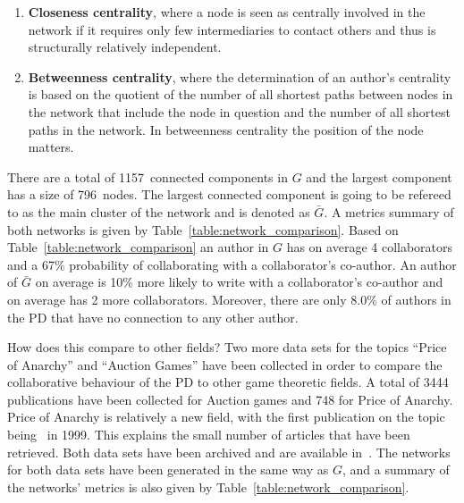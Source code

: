 \documentclass{article}
\theoremstyle{definition}
\newcommand{\isolatedpercentage}{8.0}
\newcommand{\connectedcomponents}{1157}
\newcommand{\largestcc}{796}
\begin{document}
\begin{enumerate}
    \item \textbf{Closeness centrality}, where a node
    is seen as centrally involved in the network if it requires only few
    intermediaries to contact others and thus is structurally relatively
    independent.
    \item \textbf{Betweenness centrality},
    where the determination of an author's centrality is based on the quotient
    of the number of all shortest paths between nodes in the network that
    include the node in question and the number of all shortest paths in the
    network. In betweenness centrality the position of the node matters.
\end{enumerate}

There are a total of
\connectedcomponents~connected components in \(G\) and the largest component has
a size of \largestcc~nodes. The largest connected component is going to be
refereed to as the main cluster of the network and is denoted as \(\bar{G}\). A
metrics summary of both networks is given
by Table~\ref{table:network_comparison}.
Based on Table~\ref{table:network_comparison} an author in \(G\) has on
average 4 collaborators and a 67\% probability of collaborating with a
collaborator's co-author. An author of \(\bar{G}\) on average is 10\% more likely
to write with a collaborator's co-author and on average has 2 more
collaborators. Moreover, there are only \isolatedpercentage\% of authors in the
PD that have no connection to any other author.

How does this compare to other fields? Two more data sets for the topics
``Price of Anarchy'' and ``Auction Games'' have been collected in order to
compare the collaborative behaviour of the PD to other game theoretic fields. A
total of 3444 publications have been collected for Auction games and 748 for
Price of Anarchy. Price of Anarchy is relatively a new field, with the first
publication on the topic being~\citep{Koutsoupias1999} in 1999. This explains the
small number of articles that have been retrieved. Both data sets have been
archived and are available in~\citep{auction_data_2018, anarchy_data_2018}.
The networks for both data sets have been generated in the same way as \(G\),
and a summary of the networks' metrics is also given by Table~\ref{table:network_comparison}.
\end{document}
